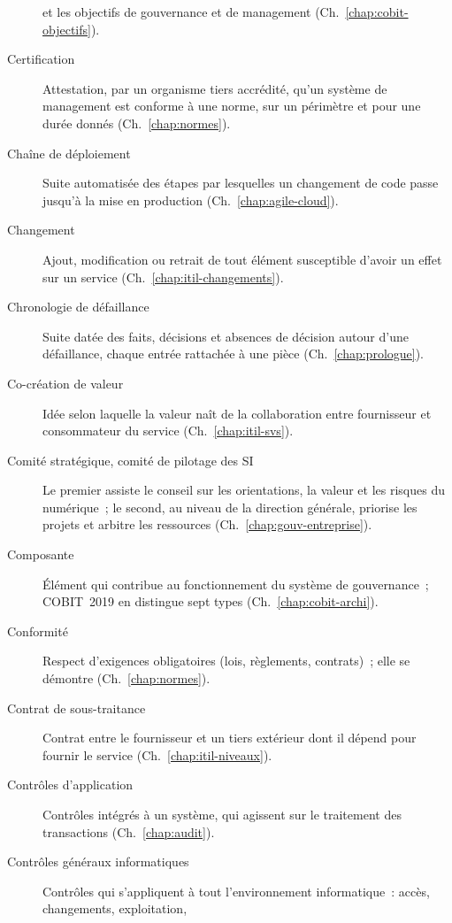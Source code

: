 \begin{description}
          et les objectifs de gouvernance et de management
          (Ch.~\ref{chap:cobit-objectifs}).
    \item[Certification] Attestation, par un organisme tiers accrédité,
          qu'un système de management est conforme à une norme, sur un
          périmètre et pour une durée donnés (Ch.~\ref{chap:normes}).
    \item[Chaîne de déploiement] Suite automatisée des étapes par lesquelles
          un changement de code passe jusqu'à la mise en production
          (Ch.~\ref{chap:agile-cloud}).
    \item[Changement] Ajout, modification ou retrait de tout élément
          susceptible d'avoir un effet sur un service
          (Ch.~\ref{chap:itil-changements}).
    \item[Chronologie de défaillance] Suite datée des faits, décisions et
          absences de décision autour d'une défaillance, chaque entrée
          rattachée à une pièce (Ch.~\ref{chap:prologue}).
    \item[Co-création de valeur] Idée selon laquelle la valeur naît de la
          collaboration entre fournisseur et consommateur du service
          (Ch.~\ref{chap:itil-svs}).
    \item[Comité stratégique, comité de pilotage des SI] Le premier assiste
          le conseil sur les orientations, la valeur et les risques du
          numérique~; le second, au niveau de la direction générale,
          priorise les projets et arbitre les ressources
          (Ch.~\ref{chap:gouv-entreprise}).
    \item[Composante] Élément qui contribue au fonctionnement du système de
          gouvernance~; COBIT~2019 en distingue sept types
          (Ch.~\ref{chap:cobit-archi}).
    \item[Conformité] Respect d'exigences obligatoires (lois, règlements,
          contrats)~; elle se démontre (Ch.~\ref{chap:normes}).
    \item[Contrat de sous-traitance] Contrat entre le fournisseur et un tiers
          extérieur dont il dépend pour fournir le service
          (Ch.~\ref{chap:itil-niveaux}).
    \item[Contrôles d'application] Contrôles intégrés à un système, qui
          agissent sur le traitement des transactions (Ch.~\ref{chap:audit}).
    \item[Contrôles généraux informatiques] Contrôles qui s'appliquent à tout
          l'environnement informatique~: accès, changements, exploitation,

\end{description}
